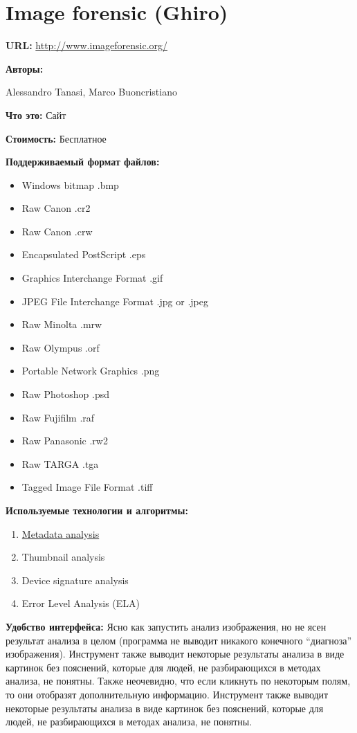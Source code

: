 \newpage

\section{Image forensic (Ghiro)}

\textbf{URL: } \url{http://www.imageforensic.org/}

\textbf{Авторы:}

Alessandro Tanasi, Marco Buoncristiano

\textbf{Что это:} Сайт

\textbf{Стоимость:} Бесплатное

\textbf{Поддерживаемый формат файлов:}
\begin{itemize}
\item Windows bitmap .bmp
\item Raw Canon .cr2
\item Raw Canon .crw
\item Encapsulated PostScript .eps
\item Graphics Interchange Format .gif
\item JPEG File Interchange Format .jpg or .jpeg
\item Raw Minolta .mrw
\item Raw Olympus .orf
\item Portable Network Graphics .png
\item Raw Photoshop .psd
\item Raw Fujifilm .raf
\item Raw Panasonic .rw2
\item Raw TARGA .tga
\item Tagged Image File Format .tiff
\end{itemize} 

\textbf{Используемые технологии и алгоритмы:}

\begin{enumerate}
  \item \href{http://fotoforensics.com/tutorial-meta.php}{Metadata analysis}
  \item Thumbnail analysis
  
  \item Device signature analysis
  
  \item Error Level Analysis (ELA)
\end{enumerate} 

\textbf{Удобство интерфейса:}
Ясно как запустить анализ изображения, но не ясен результат анализа в целом (программа не выводит никакого конечного “диагноза” изображения).
Инструмент также выводит некоторые результаты анализа в виде картинок без пояснений, которые для людей, не разбирающихся в методах анализа, не понятны.
Также неочевидно, что если кликнуть по некоторым полям, то они отобразят дополнительную информацию.
Инструмент также выводит некоторые результаты анализа в виде картинок без пояснений, которые для людей, не разбирающихся в методах анализа, не понятны.
  
